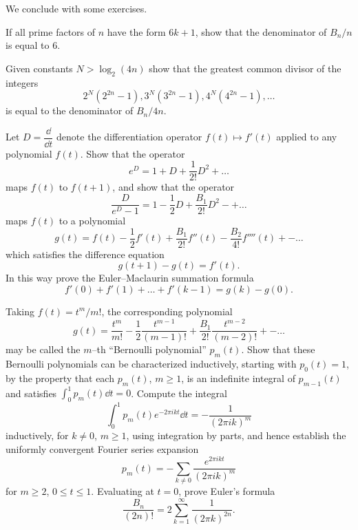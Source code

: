 \documentclass[../main]{subfiles}
\begin{document}
We conclude with some exercises.

\begin{problem}[J. F. Adams]
\label{prob:B-1}
If all prime factors of $n$ have the form $6 k + 1$, show that the denominator of $B_n/n$ is equal to $6$. 
\end{problem}

\begin{problem}[J. F. Adams]
\label{prob:B-2}
Given constants $N > \log_2(4n)$ show that the greatest common divisor of the integers \[2^N(2^{2n} - 1), 3^N(3^{2n} - 1), 4^N(4^{2n} - 1), \ldots\] is equal to the denominator of $B_n/4n$. 
\end{problem}

\begin{problem}
\label{prob:B-3}
Let $D = \dfrac \dd {\dd t}$ denote the differentiation operator $f(t) \mapsto f'(t)$ applied to any polynomial $f(t)$. Show that the operator \[e^D = 1 + D + \frac 1 {2!} D^2 + \ldots\] maps $f(t)$ to $f(t + 1)$, and show that the operator \[\frac D {e^D - 1} = 1 - \frac 1 2 D + \frac {B_1} {2!} D^2 - + \ldots\] maps $f(t)$ to a polynomial \[g(t) = f(t) - \frac 1 2 f'(t) + \frac {B_1} {2!} f''(t) - \frac {B_2} {4!} f''''(t) + - \ldots\] which satisfies the difference equation \[g(t + 1) - g(t) = f'(t).\] In this way prove the Euler--Maclaurin summation formula \[f'(0) + f'(1) + \ldots + f'(k - 1) = g(k) - g(0).\]
\end{problem}

\begin{problem}
\label{prob:B-4}
Taking $f(t) = t^m/m!$, the corresponding polynomial \[g(t) = \dfrac{t^m}{m!} - \frac 1 2 \dfrac{t^{m - 1}}{(m - 1)!} + \frac {B_1} {2!} \dfrac{t^{m - 2}}{(m - 2)!} + - \ldots\] may be called the $m$--th ``Bernoulli polynomial'' $p_m(t)$. Show that these Bernoulli polynomials can be characterized inductively, starting with $p_0(t) = 1$, by the property that each $p_m(t)$, $m \ge 1$, is an indefinite integral of $p_{m - 1}(t)$ and satisfies $\int_0^1 p_m(t) \dd t = 0$. Compute the integral \[\int_0^1 p_m(t) e^{-2 \pi i k t} \dd t = -\dfrac{1}{(2 \pi i k)^m}\] inductively, for $k \ne 0$, $m \ge 1$, using integration by parts, and hence establish the uniformly convergent Fourier series expansion \[p_m(t) = -\sum_{k \ne 0} \dfrac{e^{2 \pi i k t}}{(2 \pi i k)^m}\] for $m \ge 2$, $0 \le t \le 1$. Evaluating at $t = 0$, prove Euler's formula \[\dfrac{B_n}{(2n)!} = 2 \sum_{k = 1}^\infty \dfrac{1}{(2 \pi k)^{2n}}.\]
\end{problem}
\end{document}
